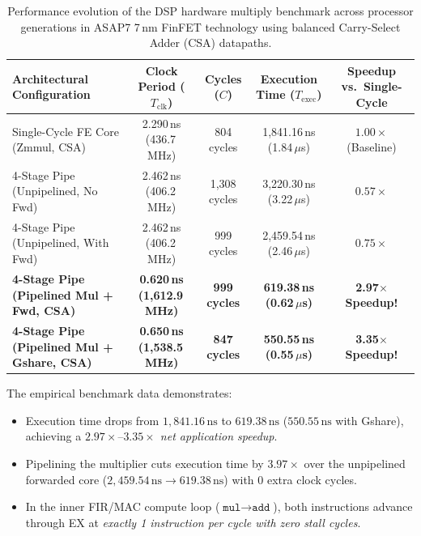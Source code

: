 \begin{table}[htbp]
\centering
\small
\begin{tabular}{|l|c|c|c|c|}
\hline
\textbf{Architectural Configuration} & \textbf{Clock Period ($T_{\text{clk}}$)} & \textbf{Cycles ($C$)} & \textbf{Execution Time ($T_{\text{exec}}$)} & \textbf{Speedup vs.\ Single-Cycle} \\
\hline
Single-Cycle FE Core (Zmmul, CSA)         & 2.290\,ns (436.7\,MHz)                  & 804 cycles           & 1,841.16\,ns (1.84\,$\mu$s)                & $1.00\times$ (Baseline) \\
4-Stage Pipe (Unpipelined, No Fwd)   & 2.462\,ns (406.2\,MHz)                  & 1,308 cycles         & 3,220.30\,ns (3.22\,$\mu$s)                & $0.57\times$ \\
4-Stage Pipe (Unpipelined, With Fwd) & 2.462\,ns (406.2\,MHz)                  & 999 cycles           & 2,459.54\,ns (2.46\,$\mu$s)                & $0.75\times$ \\
\textbf{4-Stage Pipe (Pipelined Mul + Fwd, CSA)} & \textbf{0.620\,ns (1,612.9\,MHz)}  & \textbf{999 cycles}  & \textbf{619.38\,ns (0.62\,$\mu$s)}       & \textbf{2.97$\times$ Speedup!} \\
\textbf{4-Stage Pipe (Pipelined Mul + Gshare, CSA)} & \textbf{0.650\,ns (1,538.5\,MHz)}  & \textbf{847 cycles}  & \textbf{550.55\,ns (0.55\,$\mu$s)}       & \textbf{3.35$\times$ Speedup!} \\
\hline
\end{tabular}
\caption{Performance evolution of the DSP hardware multiply benchmark across processor generations in ASAP7 7\,nm FinFET technology using balanced Carry-Select Adder (CSA) datapaths.}\label{tab:dsp_kernel_speedup_evolution}
\end{table}

The empirical benchmark data demonstrates:
\begin{itemize}
    \item Execution time drops from $1,841.16\,\text{ns}$ to \textit{$619.38\,\text{ns}$} ($550.55\,\text{ns}$ with Gshare), achieving a \textit{$2.97\times\text{--}3.35\times$ net application speedup}.
    \item Pipelining the multiplier cuts execution time by \textit{$3.97\times$} over the unpipelined forwarded core ($2,459.54\,\text{ns} \to 619.38\,\text{ns}$) with 0 extra clock cycles.
    \item In the inner FIR/MAC compute loop ($\texttt{mul} \to \texttt{add}$), both instructions advance through EX at \textit{exactly 1 instruction per cycle with zero stall cycles}.
\end{itemize}

